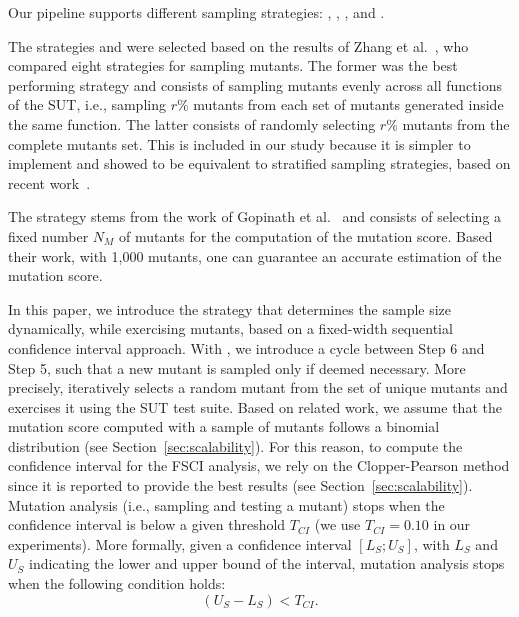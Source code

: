 Our pipeline supports different sampling strategies: , ,  , and .

The strategies  and  were selected based on the results of Zhang et al.~\cite{zhang2013operator}, who compared eight strategies for sampling mutants.
The former was the best performing strategy and consists of sampling mutants evenly across all functions of the SUT, i.e., sampling $r\%$ mutants from each set of mutants generated inside the same function.
The latter consists of randomly selecting $r\%$ mutants from the complete mutants set. This is included in our study because it is simpler to implement and showed to be equivalent to stratified sampling strategies, based on recent work~\cite{gopinath2015hard}.

The  strategy stems from the work of Gopinath et al.~\cite{gopinath2015hard} and consists of selecting a fixed number $N_M$ of mutants for the computation of the mutation score. Based their work, with 1,000 mutants, one can guarantee an accurate estimation of the mutation score.

In this paper, we introduce the  strategy that determines the sample size dynamically, while exercising mutants, based on a fixed-width sequential confidence interval approach.
With , we introduce a cycle between Step 6 and Step 5, such that a new mutant is sampled only if deemed necessary.
 More precisely, \APPR iteratively selects a random mutant from the set of unique mutants and exercises it using the SUT test suite.
Based on related work, we assume that the mutation score computed with a sample of mutants follows a binomial distribution (see Section~\ref{sec:scalability}).
For this reason, to compute the confidence interval for the FSCI analysis, we rely on the Clopper-Pearson method since it is reported to provide the best results (see Section~\ref{sec:scalability}).
Mutation analysis (i.e., sampling and testing a mutant) stops when the confidence interval is below a given threshold $T_{\mathit{CI}}$ (we use $T_{\mathit{CI}}=0.10$ in our experiments). More formally, given a confidence interval
$[\mathit{L}_{S};\mathit{U}_{S}]$, with $\mathit{L}_{S}$ and $\mathit{U}_{S}$ indicating the lower and upper bound of the interval, mutation analysis stops when the following condition holds:
\begin{equation}
\label{eq:CI:T}
(\mathit{U}_{S}-\mathit{L}_{S})<T_{\mathit{CI}}.
\end{equation}

